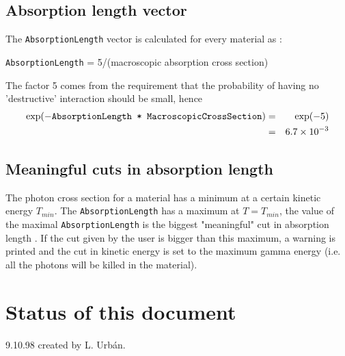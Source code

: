     \subsection{Absorption length vector}
        The {\tt AbsorptionLength} vector is calculated for every material as :
         \begin{center}
                 {\tt AbsorptionLength} = 5/(macroscopic absorption cross section)
         \end{center}
        The factor 5 comes from the requirement that the probability of having
        no 'destructive' interaction should be small, hence 
        \begin{eqnarray*} 
        \exp(-\mbox{{\tt AbsorptionLength * MacroscopicCrossSection}}) &=&\exp(-5) \\
         &=& 6.7 \times 10^{-3}
        \end{eqnarray*}
     \subsection{Meaningful cuts in absorption length}
         The photon cross section for a material has a minimum at a certain kinetic
         energy $T_{min}$. The {\tt AbsorptionLength} has a maximum at $T=T_{min}$, the value of
         the maximal {\tt AbsorptionLength} is the biggest "meaningful" cut in absorption
         length . If the cut given by the user is bigger than this maximum, a warning
         is printed and the cut in kinetic energy is set to the maximum gamma energy
         (i.e. all the photons will be killed in the material).  

\section{Status of this document}
   9.10.98  created by L. Urb\'an.
